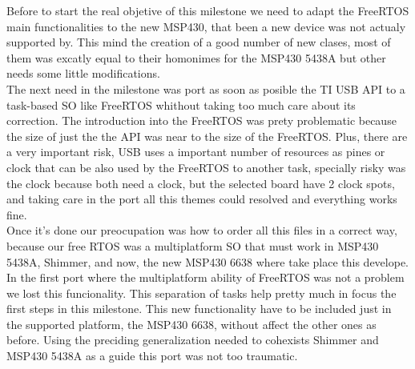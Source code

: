 		Before to start the real objetive of this milestone we need to adapt the FreeRTOS main functionalities to the new MSP430, that been a new device was not actualy supported by. This mind the creation of a good number of new clases, most of them was excatly equal to their homonimes for the MSP430 5438A but other needs some little modifications.\\

		The next need in the milestone was port as soon as posible the TI USB API to a task-based SO like FreeRTOS whithout taking too much care about its correction. The introduction into the FreeRTOS was prety problematic because the size of just the the API was near to the size of the FreeRTOS. Plus, there are a very important risk, USB uses a important number of resources as pines or clock that can be also used by the FreeRTOS to another task, specially risky was the clock because both need a clock, but the selected board have 2 clock spots, and taking care in the port all this themes could resolved and everything works fine.\\

		Once it's done our preocupation was how to order all this files in a correct way, because our free RTOS was a multiplatform SO that must work in MSP430 5438A, Shimmer, and now, the new MSP430 6638 where take place this develope. In the first port where the multiplatform ability of FreeRTOS was not a problem we lost this funcionality. This separation of tasks help pretty much in focus the first steps in this milestone. This new functionality have to be included just in the supported platform, the MSP430 6638, without affect the other ones as before. Using the preciding generalization needed to cohexists Shimmer and MSP430 5438A as a guide this port was not too traumatic.

